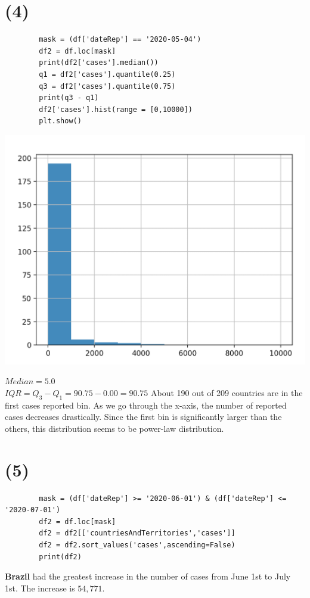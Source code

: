 \documentclass[12pt]{article}
\begin{document}
    \section*{(4)}
    \begin{lstlisting}
        mask = (df['dateRep'] == '2020-05-04')
        df2 = df.loc[mask]
        print(df2['cases'].median())
        q1 = df2['cases'].quantile(0.25)
        q3 = df2['cases'].quantile(0.75)
        print(q3 - q1)
        df2['cases'].hist(range = [0,10000])
        plt.show()
    \end{lstlisting}
    \begin{center}
        \includegraphics[scale=0.5]{fig/p4.png}
    \end{center}
    $Median = 5.0$\\
    $IQR = Q_{3} - Q_{1} = 90.75 - 0.00 = 90.75$
    About 190 out of 209 countries are in the first cases reported bin. As we go through the x-axis, the number of reported cases decreases drastically.
    Since the first bin is significantly larger than the others, this distribution seems to be power-law distribution.

    \section*{(5)}
    \begin{lstlisting}
        mask = (df['dateRep'] >= '2020-06-01') & (df['dateRep'] <= '2020-07-01')
        df2 = df.loc[mask]
        df2 = df2[['countriesAndTerritories','cases']]
        df2 = df2.sort_values('cases',ascending=False)
        print(df2)
    \end{lstlisting}
    \textbf{Brazil} had the greatest increase in the number of cases from June 1st to July 1st. The increase is $54,771$.
\end{document}
